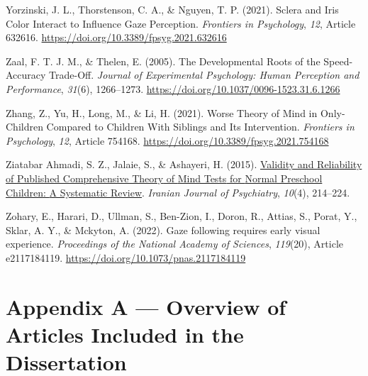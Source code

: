 \documentclass[
]{scrbook}
\newlength{\cslhangindent}
\newenvironment{CSLReferences}[2] %
 {\begin{list}{}{%
  \setlength{\itemindent}{0pt}
  \setlength{\leftmargin}{0pt}
  \setlength{\parsep}{0pt}
  \ifodd #1
   \setlength{\leftmargin}{\cslhangindent}
   \setlength{\itemindent}{-1\cslhangindent}
  \fi
  \setlength{\itemsep}{#2\baselineskip}}}
 {\end{list}}
\begin{document}
\begin{CSLReferences}{1}{0}
Yorzinski, J. L., Thorstenson, C. A., \& Nguyen, T. P. (2021). Sclera and {Iris Color Interact} to {Influence Gaze Perception}. \emph{Frontiers in Psychology}, \emph{12}, Article 632616. \url{https://doi.org/10.3389/fpsyg.2021.632616}

Zaal, F. T. J. M., \& Thelen, E. (2005). The {Developmental Roots} of the {Speed-Accuracy Trade-Off}. \emph{Journal of Experimental Psychology: Human Perception and Performance}, \emph{31}(6), 1266--1273. \url{https://doi.org/10.1037/0096-1523.31.6.1266}

Zhang, Z., Yu, H., Long, M., \& Li, H. (2021). Worse {Theory} of {Mind} in {Only-Children Compared} to {Children With Siblings} and {Its Intervention}. \emph{Frontiers in Psychology}, \emph{12}, Article 754168. \url{https://doi.org/10.3389/fpsyg.2021.754168}

Ziatabar Ahmadi, S. Z., Jalaie, S., \& Ashayeri, H. (2015). \href{https://www.ncbi.nlm.nih.gov/pmc/articles/PMC4801491}{Validity and {Reliability} of {Published Comprehensive Theory} of {Mind Tests} for {Normal Preschool Children}: {A Systematic Review}}. \emph{Iranian Journal of Psychiatry}, \emph{10}(4), 214--224.

Zohary, E., Harari, D., Ullman, S., Ben-Zion, I., Doron, R., Attias, S., Porat, Y., Sklar, A. Y., \& Mckyton, A. (2022). Gaze following requires early visual experience. \emph{Proceedings of the National Academy of Sciences}, \emph{119}(20), Article e2117184119. \url{https://doi.org/10.1073/pnas.2117184119}

\end{CSLReferences}

\chapter{Appendix A --- Overview of Articles Included in the Dissertation}\label{appendixA}
\end{document}
